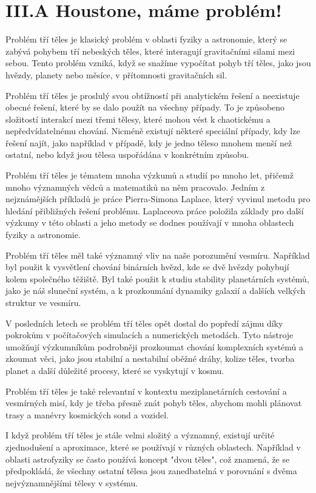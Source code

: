 \documentclass{../../../../style/mkimain}
\begin{document}
\section*{III.A Houstone, máme problém!}
Problém tří těles je klasický problém v oblasti fyziky a astronomie, který se zabývá pohybem tří nebeských těles, které interagují gravitačními silami mezi sebou. Tento problém vzniká, když se snažíme vypočítat pohyb tří těles, jako jsou hvězdy, planety nebo měsíce, v přítomnosti gravitačních sil.

Problém tří těles je proslulý svou obtížností při analytickém řešení a neexistuje obecné řešení, které by se dalo použít na všechny případy. To je způsobeno složitostí interakcí mezi třemi tělesy, které mohou vést k chaotickému a nepředvídatelnému chování. Nicméně existují některé speciální případy, kdy lze řešení najít, jako například v případě, kdy je jedno těleso mnohem menší než ostatní, nebo když jsou tělesa uspořádána v konkrétním způsobu.

Problém tří těles je tématem mnoha výzkumů a studií po mnoho let, přičemž mnoho významných vědců a matematiků na něm pracovalo. Jedním z nejznámějších příkladů je práce Pierra-Simona Laplace, který vyvinul metodu pro hledání přibližných řešení problému. Laplaceova práce položila základy pro další výzkumy v této oblasti a jeho metody se dodnes používají v mnoha oblastech fyziky a astronomie.

Problém tří těles měl také významný vliv na naše porozumění vesmíru. Například byl použit k vysvětlení chování binárních hvězd, kde se dvě hvězdy pohybují kolem společného těžiště. Byl také použit k studiu stability planetárních systémů, jako je náš sluneční systém, a k prozkoumání dynamiky galaxií a dalších velkých struktur ve vesmíru.

V posledních letech se problém tří těles opět dostal do popředí zájmu díky pokrokům v počítačových simulacích a numerických metodách. Tyto nástroje umožňují výzkumníkům podrobněji prozkoumat chování komplexních systémů a zkoumat věci, jako jsou stabilní a nestabilní oběžné dráhy, kolize těles, tvorba planet a další důležité procesy, které se vyskytují v kosmu.

Problém tří těles je také relevantní v kontextu meziplanetárních cestování a vesmírných misí, kdy je třeba přesně znát pohyb těles, abychom mohli plánovat trasy a manévry kosmických sond a vozidel.

I když problém tří těles je stále velmi složitý a významný, existují určité zjednodušení a aproximace, které se používají v různých oblastech. Například v oblasti astrofyziky se často používá koncept "dvou těles", což znamená, že se předpokládá, že všechny ostatní tělesa jsou zanedbatelná v porovnání s dvěma nejvýznamnějšími tělesy v systému.
\end{document}
